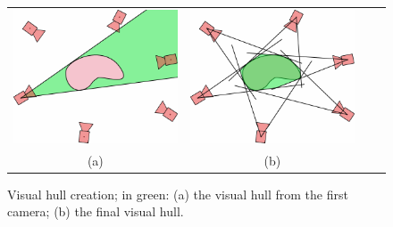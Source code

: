 \begin{figure}[t]
\centering
 \begin{tabular}{cccc}
  \includegraphics[width=0.45\columnwidth]{./img/ch_soa/visualhull01}&
  \includegraphics[width=0.45\columnwidth]{./img/ch_soa/visualhull02}\\
  (a)&(b)
 \end{tabular}
 \caption{Visual hull creation; in green: (a) the visual hull from the first camera; (b) the final visual hull.}
 \label{fig:visualhull}
\end{figure}

